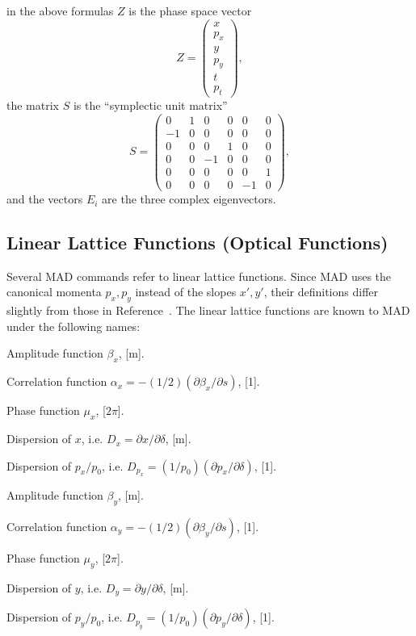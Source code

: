 in the above formulas \(Z\) is the phase space vector
\[
Z = \left(
\begin{array}{l} x \\ p_x \\ y \\ p_y \\ t \\ p_t
\end{array} \right),
\]
the matrix \(S\) is the ``symplectic unit matrix''
\[
S = \left( \begin{array}{cccccc}
 0 & 1 & 0 & 0 & 0 & 0 \\
-1 & 0 & 0 & 0 & 0 & 0 \\
 0 & 0 & 0 & 1 & 0 & 0 \\
 0 & 0 &-1 & 0 & 0 & 0 \\
 0 & 0 & 0 & 0 & 0 & 1 \\
 0 & 0 & 0 & 0 &-1 & 0
\end{array} \right ),
\]
and the vectors \(E_i\) are the three complex eigenvectors.


\subsection{Linear Lattice Functions (Optical Functions)}
\label{S-LINLAT}
Several MAD commands refer to linear lattice functions.
Since MAD uses the canonical momenta \(p_{x}, p_{y}\)
instead of the slopes \(x', y'\),
their definitions differ slightly from those
in Reference~\cite{B-COU58}.
The linear lattice functions are known to MAD under the following names:

\begin{mylist}
Amplitude function \(\beta_{x}\), [m].

Correlation function
\(\alpha_{x}=-(1/2)(\partial\beta_{x}/\partial s)\), [1].

Phase function \(\mu_{x}\), [\(2\pi\)].

Dispersion of \(x\), i.e.
\(D_{x}=\partial x/\partial\delta\), [m].

Dispersion of \(p_{x}/p_{0}\), i.e.
\(D_{p_{x}}=(1/p_{0})(\partial p_{x}/\partial\delta)\), [1].

Amplitude function \(\beta_{y}\), [m].

Correlation function
\(\alpha_{y}=-(1/2)(\partial\beta_{y}/\partial s)\), [1].

Phase function \(\mu_{y}\), [\(2\pi\)].

Dispersion of \(y\), i.e.
\(D_{y}=\partial y/\partial\delta\), [m].

Dispersion of \(p_{y}/p_{0}\), i.e.
\(D_{p_{y}}=(1/p_{0})(\partial p_{y}/\partial\delta)\), [1].
\end{mylist}

